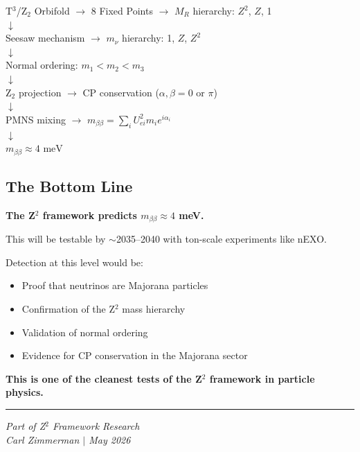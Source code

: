 \documentclass[12pt,a4paper]{article}
\begin{document}
\begin{center}
T$^3$/Z$_2$ Orbifold $\rightarrow$ 8 Fixed Points $\rightarrow$ $M_R$ hierarchy: $Z^2$, $Z$, 1 \\
$\downarrow$ \\
Seesaw mechanism $\rightarrow$ $m_\nu$ hierarchy: 1, $Z$, $Z^2$ \\
$\downarrow$ \\
Normal ordering: $m_1 < m_2 < m_3$ \\
$\downarrow$ \\
Z$_2$ projection $\rightarrow$ CP conservation ($\alpha, \beta = 0$ or $\pi$) \\
$\downarrow$ \\
PMNS mixing $\rightarrow$ $m_{\beta\beta} = \sum_i U_{ei}^2 m_i e^{i\alpha_i}$ \\
$\downarrow$ \\
$\boxed{m_{\beta\beta} \approx 4 \text{ meV}}$
\end{center}

\subsection{The Bottom Line}

\textbf{The Z$^2$ framework predicts $m_{\beta\beta} \approx 4$ meV.}

This will be testable by $\sim$2035--2040 with ton-scale experiments like nEXO.

Detection at this level would be:
\begin{itemize}
\item Proof that neutrinos are Majorana particles
\item Confirmation of the Z$^2$ mass hierarchy
\item Validation of normal ordering
\item Evidence for CP conservation in the Majorana sector
\end{itemize}

\textbf{This is one of the cleanest tests of the Z$^2$ framework in particle physics.}

\vspace{1cm}
\hrule
\vspace{0.5cm}
\textit{Part of Z$^2$ Framework Research}\\
\textit{Carl Zimmerman $|$ May 2026}
\end{document}
